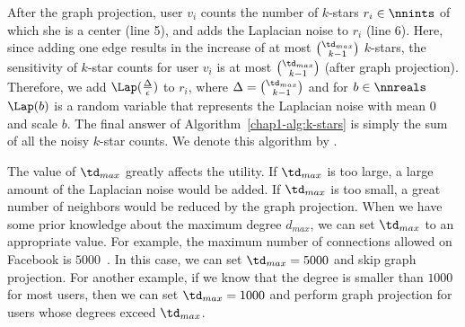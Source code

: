 After the graph projection, 
user $v_i$ 
counts the number of $k$-stars $r_i \in \nnints$ of which she is a center (line 5), and 
adds the Laplacian noise 
to 
$r_i$ 
(line 6). 
Here, since adding one edge results in the increase of at most $\binom{\td_{max}}{k-1}$ $k$-stars, the 
sensitivity of 
$k$-star counts for user $v_i$ 
is at most $\binom{\td_{max}}{k-1}$ (after graph projection). 
Therefore, we add $\Lap(\frac{\Delta}{\epsilon})$ to $r_i$, where $\Delta = \binom{\td_{max}}{k-1}$ and 
for $b \in \nnreals$ 
$\Lap(b)$ is a random variable that represents the Laplacian noise with mean $0$ and scale $b$. 
The final answer of Algorithm~\ref{chap1-alg:k-stars} is
simply the sum of all the noisy $k$-star counts. 
We denote this algorithm by .

The value of $\td_{max}$ greatly affects the utility. 
If $\td_{max}$ is too large, a large amount of the Laplacian noise would be added. 
If $\td_{max}$ is too small, a great number of neighbors would be reduced by the graph projection. 
When we have some prior knowledge about the maximum degree $d_{max}$, we can set $\td_{max}$ to an appropriate value. 
For example, 
the maximum number of connections allowed on Facebook is $5000$~\cite{Facebook_Limit}. 
In this case, we can set $\td_{max}=5000$ 
and skip graph projection. 
For another example, 
if we know that the degree is smaller than $1000$ for most users, then we can set $\td_{max} = 1000$ and perform graph projection for 
users whose degrees exceed $\td_{max}$. 

